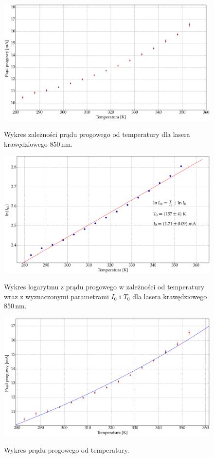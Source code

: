 \documentclass[a4paper, portrait,12pt]{report}
\begin{document}
\begin{figure}
\center
  \includegraphics[scale=0.30]{plot850P010/plot_i_th_error.eps}
  \label{rys1}
  \caption{Wykres zależności prądu progowego od temperatury dla lasera krawędziowego 850\,nm.} 
\end{figure}\begin{figure}
\center
  \includegraphics[scale=0.30]{plot850P010/plot_fit.eps}
  \label{rys1}
  \caption{Wykres logarytmu z prądu progowego w zależności od temperatury wraz z wyznaczonymi parametrami $I_0$ i $T_0$ dla lasera krawędziowego 850\,nm.} 
  \includegraphics[scale=0.30]{plot850P010/plot_exp.eps}
  \label{rys1}
  \caption{Wykres prądu progowego od temperatury.} 
\end{figure}
\end{document}
